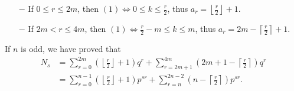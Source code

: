 \documentclass[11pt,a4paper]{article}
\begin{document}
\begin{enumerate}
\item[$-$] If $0 \leq r \leq 2m$, then $(1) \iff 0 \leq k \leq \frac{r}{2}$, thus $a_r = \left \lfloor \frac{r}{2} \right \rfloor + 1$.
\item[$-$] If $2m < r \leq 4m$, then $(1) \iff \frac{r}{2} -m  \leq k \leq m$, thus $a_r = 2m - \left \lceil \frac{r}{2} \right \rceil + 1$.
\end{enumerate}
If $n$ is odd, we have proved that
\begin{align*}
N_s &= \sum_{r=0}^{2m} \left (\left \lfloor \frac{r}{2} \right \rfloor + 1 \right) q^r + \sum_{r=2m+1}^{4m} \left(2m+1 - \left \lceil \frac{r}{2} \right \rceil \right) q^r\\
&=\sum_{r=0}^{n-1} \left (\left \lfloor \frac{r}{2} \right \rfloor + 1 \right) p^{sr} + \sum_{r=n}^{2n-2} \left (n- \left \lceil \frac{r}{2} \right \rceil  \right) p^{sr}.
\end{align*}

\bigskip
\end{document}
